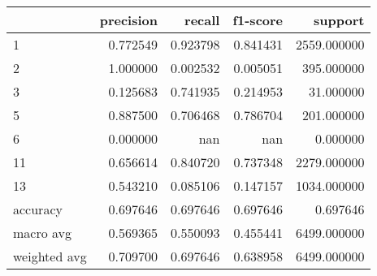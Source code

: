 \begin{tabular}{lrrrr}
\toprule
 & precision & recall & f1-score & support \\
\midrule
1 & 0.772549 & 0.923798 & 0.841431 & 2559.000000 \\
2 & 1.000000 & 0.002532 & 0.005051 & 395.000000 \\
3 & 0.125683 & 0.741935 & 0.214953 & 31.000000 \\
5 & 0.887500 & 0.706468 & 0.786704 & 201.000000 \\
6 & 0.000000 & nan & nan & 0.000000 \\
11 & 0.656614 & 0.840720 & 0.737348 & 2279.000000 \\
13 & 0.543210 & 0.085106 & 0.147157 & 1034.000000 \\
accuracy & 0.697646 & 0.697646 & 0.697646 & 0.697646 \\
macro avg & 0.569365 & 0.550093 & 0.455441 & 6499.000000 \\
weighted avg & 0.709700 & 0.697646 & 0.638958 & 6499.000000 \\
\bottomrule
\end{tabular}
